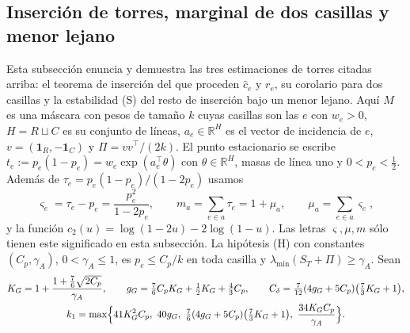 \subsection{Inserción de torres, marginal de dos casillas y menor lejano}\label{app:insercion}
Esta subsección enuncia y demuestra las tres estimaciones de torres citadas arriba: el teorema de
inserción del que proceden $\hat c_e$ y $r_e$, su corolario para dos casillas y la estabilidad (S) del
resto de inserción bajo un menor lejano. Aquí $M$ es una máscara con pesos de tamaño $k$ cuyas casillas
son las $e$ con $w_e>0$, $H=R\sqcup C$ es su conjunto de líneas, $a_e\in\mathbb R^H$ es el vector de
incidencia de $e$, $v=(\mathbf1_R,-\mathbf1_C)$ y $\Pi=vv^\top/(2k)$. El punto estacionario se escribe
$t_e:=p_e(1-p_e)=w_e\exp(a_e^\top\theta)$ con $\theta\in\mathbb R^H$, masas de línea uno y
$0<p_e<\tfrac12$. Además de $\tau_e=p_e(1-p_e)/(1-2p_e)$ usamos
\[
 \varsigma_e=\tau_e-p_e=\frac{p_e^2}{1-2p_e},\qquad m_a=\sum_{e\in a}\tau_e=1+\mu_a,\qquad
 \mu_a=\sum_{e\in a}\varsigma_e,
\]
y la función $c_2(u)=\log(1-2u)-2\log(1-u)$. Las letras $\varsigma,\mu,m$ sólo tienen este significado en
esta subsección. La hipótesis (H) con constantes $(C_p,\gamma_A)$, $0<\gamma_A\le1$, es $p_e\le C_p/k$
en toda casilla y $\lambda_{\min}(S_T+\Pi)\ge\gamma_A$. Sean
\begin{gather*}
 K_G=1+\frac{1+\frac76\sqrt{2C_p}}{\gamma_A},\qquad g_G=\tfrac76C_pK_G+\tfrac12K_G+\tfrac43C_p,\qquad
 C_\delta=\tfrac7{12}(4g_G+5C_p)\bigl(\tfrac73K_G+1\bigr),\\
 k_1=\max\Bigl\{41K_G^2C_p,\ 40g_G,\ \tfrac76(4g_G+5C_p)\bigl(\tfrac73K_G+1\bigr),\
            \frac{34K_GC_p}{\gamma_A}\Bigr\}.
\end{gather*}

